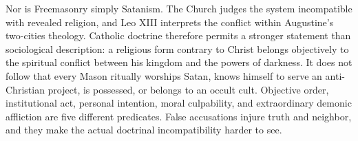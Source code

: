 Nor is Freemasonry simply Satanism. The Church judges the system incompatible with revealed religion, and Leo XIII interprets the conflict within Augustine's two-cities theology. Catholic doctrine therefore permits a stronger statement than sociological description: a religious form contrary to Christ belongs objectively to the spiritual conflict between his kingdom and the powers of darkness. It does not follow that every Mason ritually worships Satan, knows himself to serve an anti-Christian project, is possessed, or belongs to an occult cult. Objective order, institutional act, personal intention, moral culpability, and extraordinary demonic affliction are five different predicates. False accusations injure truth and neighbor, and they make the actual doctrinal incompatibility harder to see.

